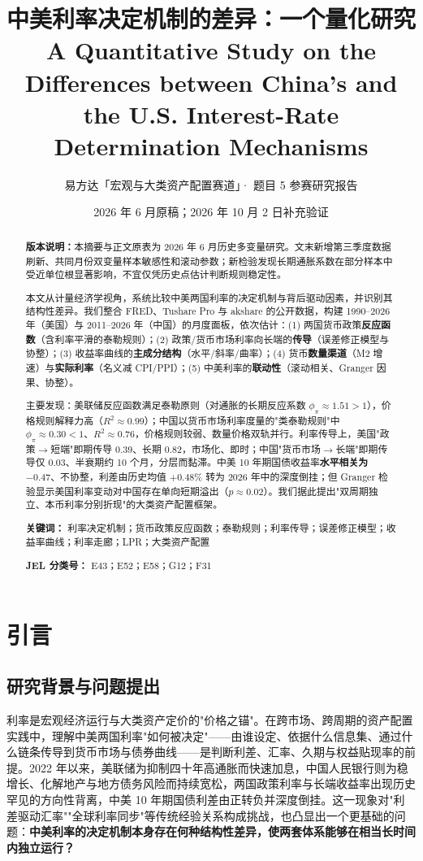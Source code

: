 \documentclass[12pt,a4paper]{ctexart}
\title{\textbf{中美利率决定机制的差异：一个量化研究}\\[6pt]
\large A Quantitative Study on the Differences between China's and \\ the U.S. Interest-Rate Determination Mechanisms}
\author{易方达「宏观与大类资产配置赛道」· 题目 5 参赛研究报告}
\date{2026 年 6 月原稿；2026 年 10 月 2 日补充验证}
\begin{document}
\maketitle
\thispagestyle{fancy}

\begin{abstract}
\linespread{1.2}\selectfont
\noindent
\textbf{版本说明：}本摘要与正文原表为 2026 年 6 月历史多变量研究。文末新增第三季度数据刷新、共同月份双变量样本敏感性和滚动参数；新检验发现长期通胀系数在部分样本中受近单位根显著影响，不宜仅凭历史点估计判断规则稳定性。

本文从计量经济学视角，系统比较中美两国利率的决定机制与背后驱动因素，并识别其结构性差异。我们整合 FRED、Tushare Pro 与 akshare 的公开数据，构建 1990--2026 年（美国）与 2011--2026 年（中国）的月度面板，依次估计：(1) 两国货币政策\textbf{反应函数}（含利率平滑的泰勒规则）；(2) 政策/货币市场利率向长端的\textbf{传导}（误差修正模型与协整）；(3) 收益率曲线的\textbf{主成分结构}（水平/斜率/曲率）；(4) 货币\textbf{数量渠道}（M2 增速）与\textbf{实际利率}（名义减 CPI/PPI）；(5) 中美利率的\textbf{联动性}（滚动相关、Granger 因果、协整）。

主要发现：美联储反应函数满足泰勒原则（对通胀的长期反应系数 $\phi_\pi\approx 1.51>1$），价格规则解释力高（$R^2\approx 0.99$）；中国以货币市场利率度量的"类泰勒规则"中 $\phi_\pi\approx 0.30<1$、$R^2\approx 0.76$，价格规则较弱、数量价格双轨并行。利率传导上，美国"政策$\to$短端"即期传导 0.39、长期 0.82，市场化、即时；中国"货币市场$\to$长端"即期传导仅 0.03、半衰期约 10 个月，分层而黏滞。中美 10 年期国债收益率\textbf{水平相关为 $-0.47$}、不协整，利差由历史均值 $+0.48\%$ 转为 2026 年中的深度倒挂；但 Granger 检验显示美国利率变动对中国存在单向短期溢出（$p\approx 0.02$）。我们据此提出"双周期独立、本币利率分别折现"的大类资产配置框架。

\noindent\textbf{关键词：} 利率决定机制；货币政策反应函数；泰勒规则；利率传导；误差修正模型；收益率曲线；利率走廊；LPR；大类资产配置

\noindent\textbf{JEL 分类号：} E43；E52；E58；G12；F31
\end{abstract}

\newpage
\tableofcontents
\newpage
\listoffigures
\listoftables
\newpage

\section{引言}

\subsection{研究背景与问题提出}
利率是宏观经济运行与大类资产定价的"价格之锚"。在跨市场、跨周期的资产配置实践中，理解中美两国利率"如何被决定"——由谁设定、依据什么信息集、通过什么链条传导到货币市场与债券曲线——是判断利差、汇率、久期与权益贴现率的前提。2022 年以来，美联储为抑制四十年高通胀而快速加息，中国人民银行则为稳增长、化解地产与地方债务风险而持续宽松，两国政策利率与长端收益率出现历史罕见的方向性背离，中美 10 年期国债利差由正转负并深度倒挂。这一现象对"利差驱动汇率""全球利率同步"等传统经验关系构成挑战，也凸显出一个更基础的问题：\textbf{中美利率的决定机制本身存在何种结构性差异，使两套体系能够在相当长时间内独立运行？}
\end{document}
